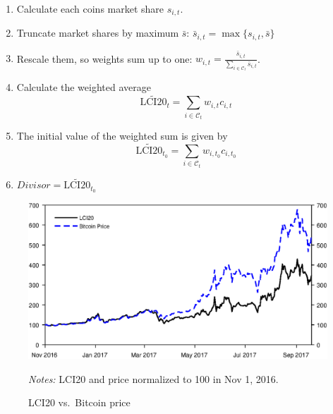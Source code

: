 \documentclass[11pt]{article}
\newcommand\fnotes[1]{\captionsetup{font=scriptsize}\caption*{\textsl{Notes:} #1}}
\begin{document}
\begin{enumerate}
  \item Calculate each coins market share $s_{i,t}$.
  \item Truncate market shares by maximum $\bar s$: $\bar s_{i,t} = \max\{ s_{i,t}, \bar s\}$
  \item Rescale them, so weights sum up to one: $w_{i,t} = \frac{\bar s_{i,t}}{\sum_{i \in \mathcal{C}_t} \bar s_{i,t}}$. %
  \item Calculate the weighted average $$\widetilde{\text{LCI20}}_t = \sum_{i \in \mathcal{C}_{t}} w_{i,t} c_{i,t}$$
  \item The initial value of the weighted sum is given by $$\widetilde{\text{LCI20}}_{t_0} = \sum_{i \in \mathcal{C}_{t}} w_{i,t_0} c_{i,t_0}$$
  \item $Divisor = \widetilde{\text{LCI20}}_{t_0}$
\end{enumerate}


\begin{figure}%
    \centering%
    \caption{LCI20 vs.\ Bitcoin price}\label{f:lci20vsBTC}%
    \includegraphics[width=\textwidth]{figs/lci20_vs_btc_norm.eps}%
    \fnotes{LCI20 and price normalized to 100 in Nov 1, 2016.}
\end{figure}
\end{document}
